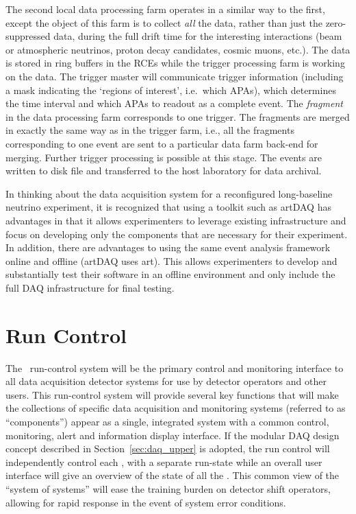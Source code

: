 The second local data processing farm operates in a similar way to the
first, except the object of this farm is to collect {\it all} the
data, rather than just the zero-suppressed data, during the full drift
time for the interesting interactions (beam or atmospheric neutrinos,
proton decay candidates, cosmic muons, etc.).  The data is stored in
ring buffers in the RCEs while the trigger processing farm is working
on the data.  The trigger master will communicate trigger information
(including a mask indicating the `regions of interest', i.e.\ which
APAs), which determines the time interval and which APAs to readout as a
complete event.  The {\it fragment} in the data processing farm
corresponds to one trigger.  The fragments are merged in exactly the
same way as in the trigger farm, i.e., all the fragments corresponding
to one event are sent to a particular data farm back-end for merging.
Further trigger processing is possible at this stage.  The events are
written to disk file and transferred to the host laboratory for data
archival.

In thinking about the data acquisition system for a reconfigured
long-baseline neutrino experiment, it is recognized that using a
toolkit such as artDAQ has advantages in that it allows experimenters
to leverage existing infrastructure and focus on developing only the components
that are necessary for their experiment.  In addition, there are
advantages to using the same event analysis framework online and
offline (artDAQ uses art).  This allows experimenters to develop and
substantially test their software in an offline environment and only
include the full DAQ infrastructure for final testing.

\section{Run Control}
\label{sec:daq_runcontrol}

The \LBNE\ run-control system will be the primary control and
monitoring interface to all data acquisition detector systems for use
by detector operators and other users.  This run-control system will
provide several key functions that will make the collections of
specific data acquisition and monitoring systems (referred to as
``components'') appear as a single, integrated system with a common
control, monitoring, alert and information display interface.  If the
modular DAQ design concept described in Section~\ref{sec:daq_upper} is
adopted, the run control will independently control each \COMPARTMENT,
 with a separate run-state while an overall user interface will
give an overview of the state of all the \COMPARTMENTS.  This common
view of the ``system of systems'' will ease the training burden on
detector shift operators, allowing for rapid response in the event of
system error conditions.

